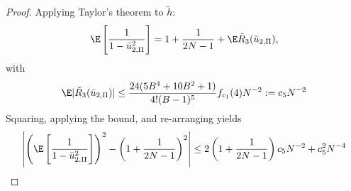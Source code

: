 \begin{proof}
  Applying Taylor's theorem to $\tilde{h}$:
  \begin{equation*}
    \E \left [ \frac{1}{1-\bar{u}_{2,\Pi}^2} \right ]
    = 1 + \frac{1}{2N-1} + \E \tilde{R}_3(\bar{u}_{2,\Pi}),
  \end{equation*}
  with
  \begin{equation*}
    \E |\tilde{R}_3(\bar{u}_{2,\Pi})| \leq \frac{24(5B^4 + 10B^2 + 1)}{4!(B-1)^5}f_{c_1}(4) N^{-2}
    := c_5 N^{-2}
  \end{equation*}
  Squaring, applying the bound, and re-arranging yields
  \begin{equation*}
    \left | \left ( \E \left [ \frac{1}{1-\bar{u}_{2,\Pi}^2} \right ] \right )^2
      - \left ( 1 + \frac{1}{2N-1} \right )^2 \right | \leq
    2 \left ( 1 + \frac{1}{2N-1} \right ) c_5 N^{-2} + c_5^2 N^{-4}
  \end{equation*}


\end{proof}
